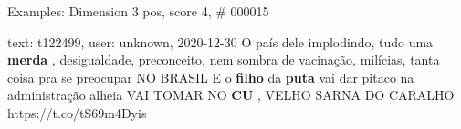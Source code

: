 \begin{frame}{Examples: Dimension 3 pos, score 4, \# 000015}
\footnotesize
\begin{exampleblock}{text: t122499, user: unknown, 2020-12-30}
O país dele implodindo, tudo uma \textbf{merda} , desigualdade, preconceito, 
nem sombra de vacinação, milícias, tanta coisa pra se preocupar NO BRASIL E o 
\textbf{filho} da \textbf{puta} vai dar pitaco na administração alheia VAI 
TOMAR NO \textbf{CU} , VELHO SARNA DO CARALHO https://t.co/tS69m4Dyis 
\end{exampleblock}
\end{frame}
